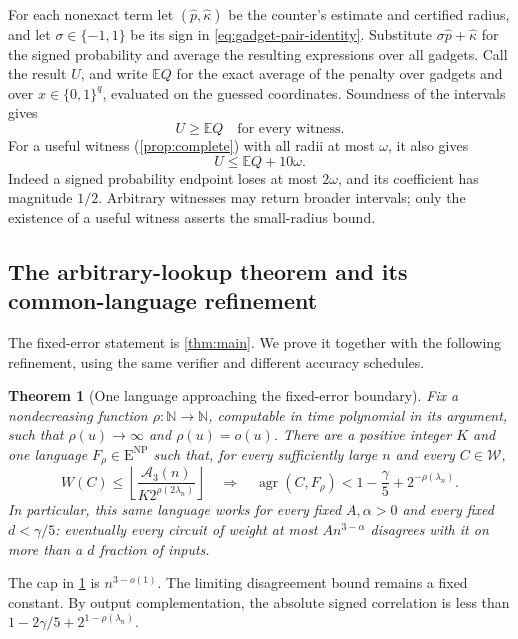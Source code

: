 \documentclass[11pt,letterpaper]{article}
\newtheorem{theorem}{Theorem}[section]
\theoremstyle{definition}
\theoremstyle{remark}
\newcommand{\N}{\mathbb N}
\newcommand{\ENP}{\mathrm{E}^{\mathrm{NP}}}
\newcommand{\cW}{\mathcal W}
\begin{document}
For each nonexact term let $(\widehat p,\widehat\kappa)$ be the
counter's estimate and certified radius, and let $\sigma\in\{-1,1\}$
be its sign in \cref{eq:gadget-pair-identity}. Substitute
$\sigma\widehat p+\widehat\kappa$ for the signed probability and
average the resulting expressions over all gadgets. Call the result
$U$, and write $\mathbb E Q$ for the exact average of the penalty over
gadgets and over $x\in\{0,1\}^q$, evaluated on the guessed coordinates.
Soundness of the intervals gives
\begin{equation}\label{eq:gadget-upper}
 U\ge\mathbb E Q\quad\text{for every witness}.
\end{equation}
For a useful witness (\cref{prop:complete}) with all radii at most
$\omega$, it also gives
\begin{equation}\label{eq:gadget-upper-complete}
 U\le\mathbb E Q+10\omega.
\end{equation}
Indeed a signed probability endpoint loses at most $2\omega$, and
its coefficient has magnitude $1/2$. Arbitrary witnesses may return
broader intervals; only the existence of a useful witness asserts the
small-radius bound.

\subsection{The arbitrary-lookup theorem and its common-language refinement}

The fixed-error statement is \cref{thm:main}. We prove it together
with the following refinement, using the same verifier and different
accuracy schedules.

\begin{theorem}[One language approaching the fixed-error boundary]
\label{thm:gadget-boundary}
Fix a nondecreasing function $\rho:\N\to\N$, computable in time
polynomial in its argument, such that $\rho(u)\to\infty$ and
$\rho(u)=o(u)$. There are a positive integer $K$ and one language
$F_\rho\in\ENP$ such that, for every sufficiently large $n$ and every
$C\in\cW$,
\[
 W(C)\le
 \left\lfloor\frac{\mathcal A_3(n)}{K2^{\rho(2\lambda_n)}}\right\rfloor
 \quad\Longrightarrow\quad
 \operatorname{agr}(C,F_\rho)<1-\frac\gamma5+2^{-\rho(\lambda_n)}.
\]
In particular, this same language works for every fixed
$A,\alpha>0$ and every fixed $d<\gamma/5$: eventually every
circuit of weight at most $An^{3-\alpha}$ disagrees with it
on more than a $d$ fraction of inputs.
\end{theorem}

The cap in \cref{thm:gadget-boundary} is $n^{3-o(1)}$. The limiting
disagreement bound remains a fixed constant. By output complementation,
the absolute signed correlation is less than
$1-2\gamma/5+2^{1-\rho(\lambda_n)}$.
\end{document}
